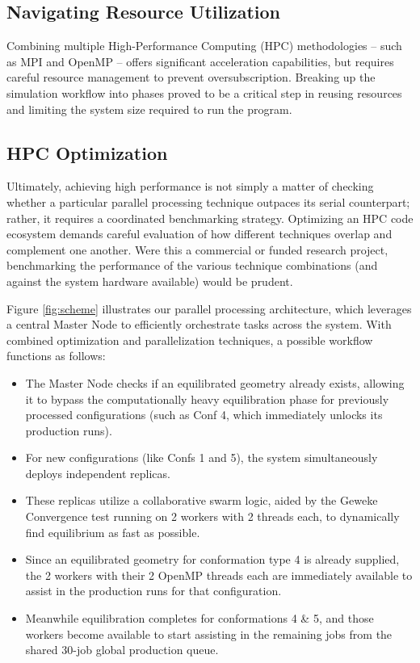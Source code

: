 \subsection{Navigating Resource Utilization}

Combining multiple High-Performance Computing (HPC) methodologies --
such as MPI and OpenMP -- offers significant acceleration capabilities,
but requires careful resource management to prevent oversubscription.
Breaking up the simulation workflow into phases proved to be a critical
step in reusing resources and limiting the system size required to run
the program.

\subsection{HPC Optimization}

Ultimately, achieving high performance is not simply a matter of
checking whether a particular parallel processing technique outpaces
its serial counterpart; rather, it requires a coordinated benchmarking
strategy. Optimizing an HPC code ecosystem demands careful evaluation
of how different techniques overlap and complement one another. Were
this a commercial or funded research project, benchmarking the
performance of the various technique combinations (and against the
system hardware available) would be prudent.

Figure \ref{fig:scheme} illustrates our parallel processing architecture,
which leverages a central Master Node to efficiently orchestrate tasks
across the system. With combined optimization and parallelization
techniques, a possible workflow functions as follows:

\begin{itemize}
  \item The Master Node checks if an equilibrated geometry already
    exists, allowing it to bypass the computationally heavy equilibration
    phase for previously processed configurations (such as Conf 4, which
    immediately unlocks its production runs).
  \item For new configurations (like Confs 1 and 5), the system
    simultaneously deploys independent replicas.
  \item These replicas utilize a collaborative swarm logic, aided by
    the Geweke Convergence test running on 2 workers with 2 threads
    each, to dynamically find equilibrium as fast as possible.
  \item Since an equilibrated geometry for conformation type 4 is
    already supplied, the 2 workers with their 2 OpenMP threads each
    are immediately available to assist in the production runs for
    that configuration.
  \item Meanwhile equilibration completes for conformations 4 \& 5,
    and those workers become available to start assisting in the
    remaining jobs from the shared 30-job global production queue.
\end{itemize}


